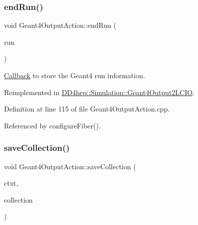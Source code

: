 \hypertarget{class_d_d4hep_1_1_simulation_1_1_geant4_output_action_ac89540100411ccec1804da9afbb843a4}{}\label{class_d_d4hep_1_1_simulation_1_1_geant4_output_action_ac89540100411ccec1804da9afbb843a4} 
\subsubsection{\texorpdfstring{end\+Run()}{endRun()}}
{\footnotesize\ttfamily void Geant4\+Output\+Action\+::end\+Run (\begin{DoxyParamCaption}\item[{const G4\+Run $\ast$}]{run }\end{DoxyParamCaption})\hspace{0.3cm}{\ttfamily [virtual]}}



\hyperlink{class_d_d4hep_1_1_callback}{Callback} to store the Geant4 run information. 



Reimplemented in \hyperlink{class_d_d4hep_1_1_simulation_1_1_geant4_output2_l_c_i_o_a9365b2b05b745a7807ce06163a7977fb}{D\+D4hep\+::\+Simulation\+::\+Geant4\+Output2\+L\+C\+IO}.



Definition at line 115 of file Geant4\+Output\+Action.\+cpp.



Referenced by configure\+Fiber().

\hypertarget{class_d_d4hep_1_1_simulation_1_1_geant4_output_action_aa43d1f01dbcb11ac1d937a878d87a90f}{}\label{class_d_d4hep_1_1_simulation_1_1_geant4_output_action_aa43d1f01dbcb11ac1d937a878d87a90f} 
\subsubsection{\texorpdfstring{save\+Collection()}{saveCollection()}}
{\footnotesize\ttfamily void Geant4\+Output\+Action\+::save\+Collection (\begin{DoxyParamCaption}\item[{\hyperlink{class_d_d4hep_1_1_simulation_1_1_geant4_output_action_1_1_output_context}{Output\+Context}$<$ G4\+Event $>$ \&}]{ctxt,  }\item[{\hyperlink{class_g4_v_hits_collection}{G4\+V\+Hits\+Collection} $\ast$}]{collection }\end{DoxyParamCaption})\hspace{0.3cm}{\ttfamily [virtual]}}



